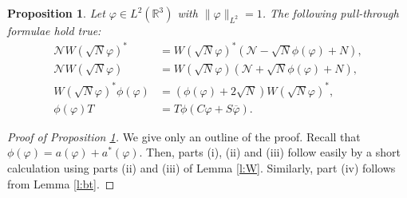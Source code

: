 \documentclass[11pt,a4paper]{scrartcl}
\newtheorem{prp}[thm]{Proposition}
\newcommand{\R}{\mathds{R}}
\newcommand{\N}{\mathcal{N}}
\begin{document}
\begin{prp}
  \label{p:formulae}
  Let $\varphi \in L^2(\R^3)$ with $\| \varphi \|_{L^2} = 1$. The following
  pull-through formulae hold true:
  \begin{align}
    \N W(\sqrt{N} \varphi)^* & = W(\sqrt{N} \varphi)^* (\N - \sqrt{N}
    \phi(\varphi) + N), \tag{i} \\
    \N W(\sqrt{N} \varphi) & = W(\sqrt{N} \varphi) (\N + \sqrt{N}
    \phi(\varphi) + N), \tag{ii} \\
    W(\sqrt{N} \varphi)^* \phi(\varphi) & = (\phi(\varphi) + 2 \sqrt{N})
    W(\sqrt{N} \varphi)^*, \tag{iii} \\
    \phi(\varphi) T & = T \phi(C \varphi + S \overline{\varphi}). \tag{iv}
  \end{align}
\end{prp}


\begin{proof}[Proof of Proposition \ref{p:formulae}]
  We give only an outline of the proof. Recall that $\phi(\varphi) =
  a(\varphi) + a^*(\varphi)$. Then, parts (i), (ii) and (iii) follow easily by
  a short calculation using parts (ii) and (iii) of Lemma \ref{l:W}.
  Similarly, part (iv) follows from Lemma \ref{l:bt}.
\end{proof}
\end{document}
